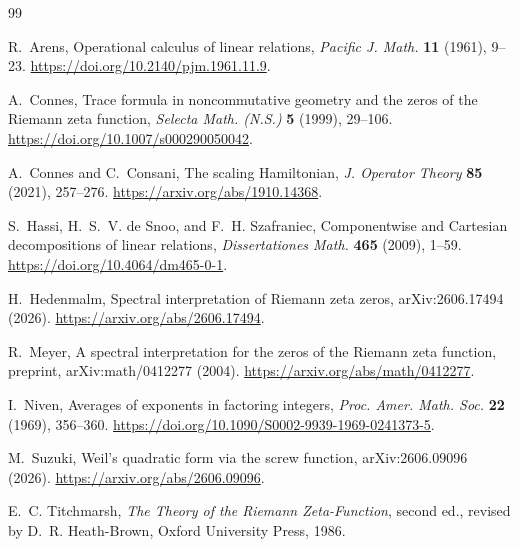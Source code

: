 \documentclass[11pt]{article}
\theoremstyle{definition}
\theoremstyle{remark}
\begin{document}
\begin{thebibliography}{99}
\small

R.~Arens,
\newblock Operational calculus of linear relations,
\newblock \emph{Pacific J. Math.} \textbf{11} (1961), 9--23.
\newblock \url{https://doi.org/10.2140/pjm.1961.11.9}.

A.~Connes,
\newblock Trace formula in noncommutative geometry and the zeros of the
Riemann zeta function,
\newblock \emph{Selecta Math. (N.S.)} \textbf{5} (1999), 29--106.
\newblock \url{https://doi.org/10.1007/s000290050042}.

A.~Connes and C.~Consani,
\newblock The scaling Hamiltonian,
\newblock \emph{J. Operator Theory} \textbf{85} (2021), 257--276.
\newblock \url{https://arxiv.org/abs/1910.14368}.

S.~Hassi, H.~S.~V. de Snoo, and F.~H. Szafraniec,
\newblock Componentwise and Cartesian decompositions of linear relations,
\newblock \emph{Dissertationes Math.} \textbf{465} (2009), 1--59.
\newblock \url{https://doi.org/10.4064/dm465-0-1}.

H.~Hedenmalm,
\newblock Spectral interpretation of Riemann zeta zeros,
\newblock arXiv:2606.17494 (2026).
\newblock \url{https://arxiv.org/abs/2606.17494}.

R.~Meyer,
\newblock A spectral interpretation for the zeros of the Riemann zeta
function,
\newblock preprint, arXiv:math/0412277 (2004).
\newblock \url{https://arxiv.org/abs/math/0412277}.

I.~Niven,
\newblock Averages of exponents in factoring integers,
\newblock \emph{Proc. Amer. Math. Soc.} \textbf{22} (1969), 356--360.
\newblock \url{https://doi.org/10.1090/S0002-9939-1969-0241373-5}.

M.~Suzuki,
\newblock Weil's quadratic form via the screw function,
\newblock arXiv:2606.09096 (2026).
\newblock \url{https://arxiv.org/abs/2606.09096}.

E.~C. Titchmarsh,
\newblock \emph{The Theory of the Riemann Zeta-Function},
\newblock second ed., revised by D.~R. Heath-Brown,
Oxford University Press, 1986.

\end{thebibliography}
\normalsize
\end{document}
